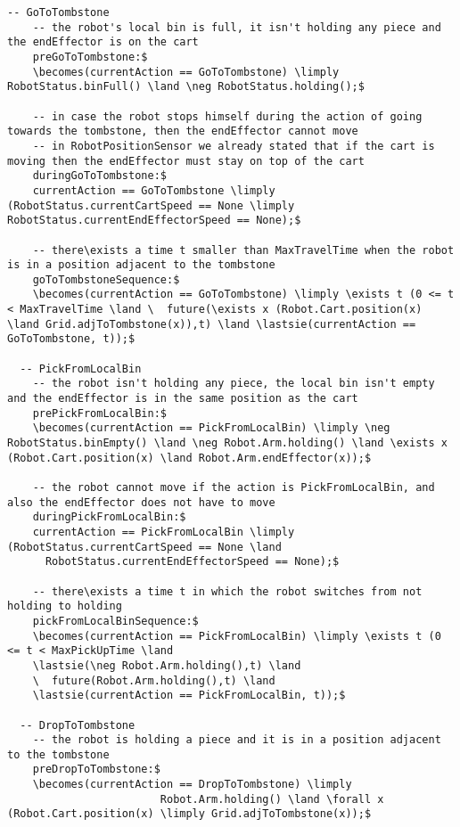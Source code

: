 \begin{lstlisting}[fontadjust, mathescape, frame=single]
  -- GoToTombstone
    -- the robot's local bin is full, it isn't holding any piece and the endEffector is on the cart
    preGoToTombstone:$
    \becomes(currentAction == GoToTombstone) \limply RobotStatus.binFull() \land \neg RobotStatus.holding();$
    
    -- in case the robot stops himself during the action of going towards the tombstone, then the endEffector cannot move
    -- in RobotPositionSensor we already stated that if the cart is moving then the endEffector must stay on top of the cart
    duringGoToTombstone:$
    currentAction == GoToTombstone \limply (RobotStatus.currentCartSpeed == None \limply RobotStatus.currentEndEffectorSpeed == None);$

    -- there\exists a time t smaller than MaxTravelTime when the robot is in a position adjacent to the tombstone
    goToTombstoneSequence:$
    \becomes(currentAction == GoToTombstone) \limply \exists t (0 <= t < MaxTravelTime \land \  future(\exists x (Robot.Cart.position(x) \land Grid.adjToTombstone(x)),t) \land \lastsie(currentAction == GoToTombstone, t));$

  -- PickFromLocalBin
    -- the robot isn't holding any piece, the local bin isn't empty and the endEffector is in the same position as the cart
    prePickFromLocalBin:$
    \becomes(currentAction == PickFromLocalBin) \limply \neg RobotStatus.binEmpty() \land \neg Robot.Arm.holding() \land \exists x (Robot.Cart.position(x) \land Robot.Arm.endEffector(x));$
    
    -- the robot cannot move if the action is PickFromLocalBin, and also the endEffector does not have to move
    duringPickFromLocalBin:$
    currentAction == PickFromLocalBin \limply (RobotStatus.currentCartSpeed == None \land
      RobotStatus.currentEndEffectorSpeed == None);$
  
    -- there\exists a time t in which the robot switches from not holding to holding
    pickFromLocalBinSequence:$
    \becomes(currentAction == PickFromLocalBin) \limply \exists t (0 <= t < MaxPickUpTime \land 
    \lastsie(\neg Robot.Arm.holding(),t) \land 
    \  future(Robot.Arm.holding(),t) \land 
    \lastsie(currentAction == PickFromLocalBin, t));$

  -- DropToTombstone
    -- the robot is holding a piece and it is in a position adjacent to the tombstone
    preDropToTombstone:$
    \becomes(currentAction == DropToTombstone) \limply
                        Robot.Arm.holding() \land \forall x (Robot.Cart.position(x) \limply Grid.adjToTombstone(x));$


\end{lstlisting}
